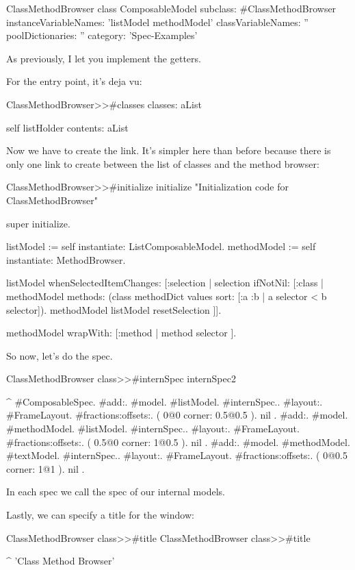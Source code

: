 \documentclass[a4paper,10pt,twoside]{book}
\begin{document}
\begin{classdef}{ClassMethodBrowser class}
ComposableModel subclass: #ClassMethodBrowser
	instanceVariableNames: 'listModel methodModel'
	classVariableNames: ''
	poolDictionaries: ''
	category: 'Spec-Examples'
\end{classdef}

As previously, I let you implement the getters.

For the entry point, it's deja vu: 
\begin{method}{ClassMethodBrowser>>\#classes}
classes: aList

	self listHolder contents: aList
\end{method}

Now we have to create the link. It's simpler here than before because there is only one link to create between the list of classes and the method browser:

\begin{method}{ClassMethodBrowser>>\#initialize}
initialize
	"Initialization code for ClassMethodBrowser"

	super initialize.

	listModel := self instantiate: ListComposableModel.
	methodModel := self instantiate: MethodBrowser.
	
	listModel whenSelectedItemChanges: [:selection |
		selection 
			ifNotNil: [:class | 
				methodModel methods: (class methodDict values sort: [:a :b | a selector < b selector]).
				methodModel listModel resetSelection ]].
	
	methodModel wrapWith: [:method | method selector ].
\end{method}

So now, let's do the spec. 
\begin{method}{ClassMethodBrowser class>>\#internSpec}
internSpec2

	^ { #ComposableSpec.
			#add:. {{#model. #listModel. #internSpec.}.
						#layout:. {#FrameLayout.
									#fractions:offsets:. 	( 0@0 corner: 0.5@0.5 ). nil }}.
			#add:. {{#model. #methodModel.  #listModel. #internSpec.}.
						#layout:. {#FrameLayout.
									#fractions:offsets:. 	( 0.5@0 corner: 1@0.5 ). nil }}.
			#add:. {{#model. #methodModel.  #textModel. #internSpec.}.
						#layout:. {#FrameLayout.
									#fractions:offsets:. 	( 0@0.5 corner: 1@1 ). nil }}}.
\end{method}
In each spec we call the spec of our internal models.

Lastly, we can specify a title for the window:
\begin{method}{ClassMethodBrowser class>>\#title}
ClassMethodBrowser class>>#title

	^ 'Class Method Browser'
\end{method}
\end{document}
